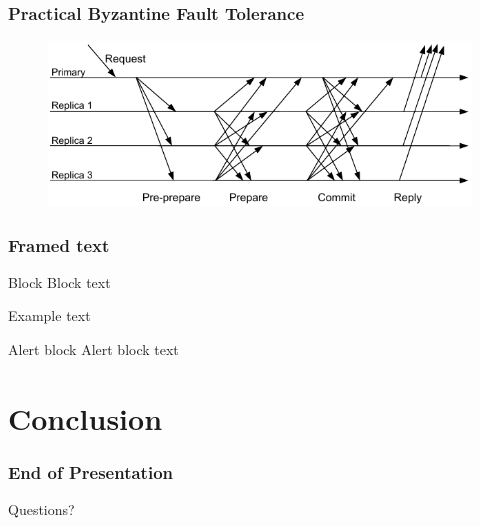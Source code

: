 \documentclass[blue]{beamer}
\begin{document}
\begin{frame}
 \frametitle{Practical Byzantine Fault Tolerance}
\begin{figure}
\begin{center}
\includegraphics[width=4.5in]{protocol}\\
\end{center}
\end{figure}
\end{frame}

\begin{frame}
\frametitle{Framed text}
\begin{block}{Block}
Block text
\end{block}
\begin{example}{Example}
text
\end{example}
\begin{alertblock}{Alert block}
Alert block text
\end{alertblock}
\end{frame}

\section{Conclusion}

\begin{frame}
 \frametitle{End of Presentation}
Questions?
\end{frame}
\end{document}
